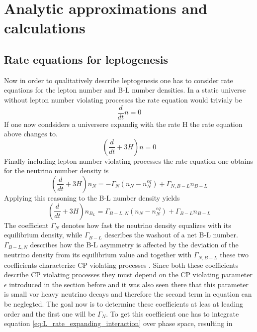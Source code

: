  \chapter{Analytic approximations and calculations}
\section{Rate equations for leptogenesis}
Now in order to qualitatively describe leptogenesis one has to consider rate equations for the lepton number and B-L number densities. In a static universe without lepton number violating processes the rate equation would trivialy be
\begin{equation}
	\frac{d}{dt}n=0
	\label{eq:rate_static_nointeraction}
\end{equation}
If one now condsiders a universere expandig with the rate H the rate equation above changes to.
\begin{equation}
\left(\frac{d}{dt}+3H\right)n=0
\label{eq:rate_expanding_nointeraction}
\end{equation}
Finally including lepton number violating processes the rate equation one obtains for the neutrino number density is
\begin{equation}
\left(\frac{d}{dt}+3H\right)n_N=-\Gamma_N\left(n_N-n_N^{eq}\right)+\Gamma_{N,B-L}n_{B-L}
\label{eq:L_rate_expanding_interaction}
\end{equation}
Applying this reasoning to the B-L number density yields
\begin{equation}
\left(\frac{d}{dt}+3H\right)n_{B_L}=\Gamma_{B-L,N}\left(n_N-n_N^{eq}\right)+\Gamma_{B-L}n_{B-L}
\label{eq:B-L_rate_expanding_interaction}
\end{equation}
The coefficient $\Gamma_N$ denotes how fast the neutrino density equalizes with its equilibrium density, while $\Gamma_{B-L}$ describes the washout of a net B-L number. $\Gamma_{B-L,N}$ describes how the B-L asymmetry is affected by the deviation of the neutrino density from its equilibrium value and together with $\Gamma_{N,B-L}$ these two coefficients characterize CP violating processes \cite[p. 4]{Bodeker:2013qaa}. Since both these coefficients describe CP violating processes they must depend on the CP violating parameter $\epsilon$ introduced in the section before and it was also seen there that this parameter is small vor heavy neutrino decays and therefore the second term in equation can be neglegted. \newline
The goal now is to determine these coefficients at leas at leading order and the first one will be $\Gamma_N$. To get this coefficient one has to integrate equation \ref{eq:L_rate_expanding_interaction} over phase space, resulting in
